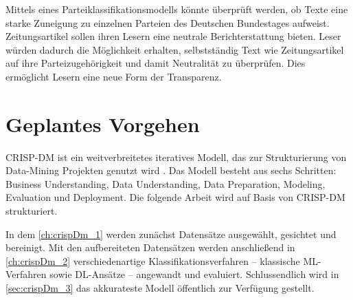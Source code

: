 
Mittels eines Parteiklassifikationsmodells könnte überprüft werden, ob Texte eine starke Zuneigung zu einzelnen Parteien des Deutschen Bundestages aufweist. Zeitungsartikel sollen ihren Lesern eine neutrale Berichterstattung bieten. Leser würden dadurch die Möglichkeit erhalten, selbstständig Text wie Zeitungsartikel auf ihre Parteizugehörigkeit und damit Neutralität zu überprüfen. Dies ermöglicht Lesern eine neue Form der Transparenz.

\section{Geplantes Vorgehen}

\ac{CRISP-DM} ist ein weitverbreitetes iteratives Modell, das zur Strukturierung von Data-Mining Projekten genutzt wird \autocite{martinez-plumed_casp-dm_2017, chapman_crisp-dm_2000}. Das Modell besteht aus sechs Schritten: Business Understanding, Data Understanding, Data Preparation, Modeling, Evaluation und Deployment. Die folgende Arbeit wird auf Basis von \ac{CRISP-DM} strukturiert.

In dem \autoref{ch:crispDm_1} werden zunächst Datensätze ausgewählt, gesichtet und bereinigt. Mit den aufbereiteten Datensätzen werden anschließend in \autoref{ch:crispDm_2} verschiedenartige Klassifikationsverfahren -- klassische \ac{ML}-Verfahren sowie \ac{DL}-Ansätze -- angewandt und evaluiert. Schlussendlich wird in \autoref{sec:crispDm_3} das akkurateste Modell öffentlich zur Verfügung gestellt.
